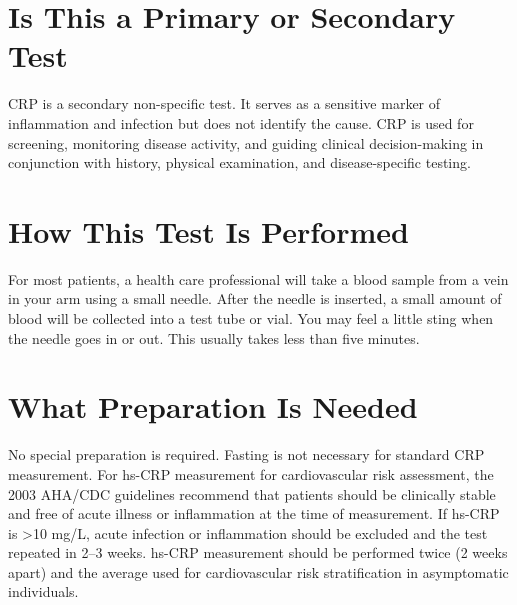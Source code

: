 \section*{Is This a Primary or Secondary Test}
CRP is a secondary non-specific test. It serves as a sensitive marker of inflammation and infection but does not identify the cause. CRP is used for screening, monitoring disease activity, and guiding clinical decision-making in conjunction with history, physical examination, and disease-specific testing.

\section*{How This Test Is Performed}
For most patients, a health care professional will take a blood sample from a vein in your arm using a small needle. After the needle is inserted, a small amount of blood will be collected into a test tube or vial. You may feel a little sting when the needle goes in or out. This usually takes less than five minutes.

\section*{What Preparation Is Needed}
No special preparation is required. Fasting is not necessary for standard CRP measurement. For hs-CRP measurement for cardiovascular risk assessment, the 2003 AHA/CDC guidelines recommend that patients should be clinically stable and free of acute illness or inflammation at the time of measurement. If hs-CRP is >10 mg/L, acute infection or inflammation should be excluded and the test repeated in 2--3 weeks. hs-CRP measurement should be performed twice (2 weeks apart) and the average used for cardiovascular risk stratification in asymptomatic individuals.


